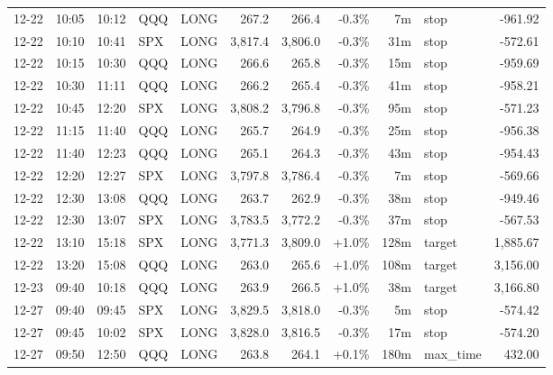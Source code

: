 \documentclass[11pt,a4paper,twoside]{article}
\begin{document}
\begin{center}
\begin{longtable}{>{\color{txtmain}}l l l l l r r r r >{\color{txtmain}}l r}
12-22 & 10:05 & 10:12 & QQQ & LONG & 267.2 & 266.4 & \textcolor{lossred}{-0.3\%} & 7m & stop & \textcolor{lossred}{-961.92} \\
12-22 & 10:10 & 10:41 & SPX & LONG & 3,817.4 & 3,806.0 & \textcolor{lossred}{-0.3\%} & 31m & stop & \textcolor{lossred}{-572.61} \\
12-22 & 10:15 & 10:30 & QQQ & LONG & 266.6 & 265.8 & \textcolor{lossred}{-0.3\%} & 15m & stop & \textcolor{lossred}{-959.69} \\
12-22 & 10:30 & 11:11 & QQQ & LONG & 266.2 & 265.4 & \textcolor{lossred}{-0.3\%} & 41m & stop & \textcolor{lossred}{-958.21} \\
12-22 & 10:45 & 12:20 & SPX & LONG & 3,808.2 & 3,796.8 & \textcolor{lossred}{-0.3\%} & 95m & stop & \textcolor{lossred}{-571.23} \\
12-22 & 11:15 & 11:40 & QQQ & LONG & 265.7 & 264.9 & \textcolor{lossred}{-0.3\%} & 25m & stop & \textcolor{lossred}{-956.38} \\
12-22 & 11:40 & 12:23 & QQQ & LONG & 265.1 & 264.3 & \textcolor{lossred}{-0.3\%} & 43m & stop & \textcolor{lossred}{-954.43} \\
12-22 & 12:20 & 12:27 & SPX & LONG & 3,797.8 & 3,786.4 & \textcolor{lossred}{-0.3\%} & 7m & stop & \textcolor{lossred}{-569.66} \\
12-22 & 12:30 & 13:08 & QQQ & LONG & 263.7 & 262.9 & \textcolor{lossred}{-0.3\%} & 38m & stop & \textcolor{lossred}{-949.46} \\
12-22 & 12:30 & 13:07 & SPX & LONG & 3,783.5 & 3,772.2 & \textcolor{lossred}{-0.3\%} & 37m & stop & \textcolor{lossred}{-567.53} \\
12-22 & 13:10 & 15:18 & SPX & LONG & 3,771.3 & 3,809.0 & \textcolor{wingreen}{+1.0\%} & 128m & target & \textcolor{wingreen}{1,885.67} \\
12-22 & 13:20 & 15:08 & QQQ & LONG & 263.0 & 265.6 & \textcolor{wingreen}{+1.0\%} & 108m & target & \textcolor{wingreen}{3,156.00} \\
12-23 & 09:40 & 10:18 & QQQ & LONG & 263.9 & 266.5 & \textcolor{wingreen}{+1.0\%} & 38m & target & \textcolor{wingreen}{3,166.80} \\
12-27 & 09:40 & 09:45 & SPX & LONG & 3,829.5 & 3,818.0 & \textcolor{lossred}{-0.3\%} & 5m & stop & \textcolor{lossred}{-574.42} \\
12-27 & 09:45 & 10:02 & SPX & LONG & 3,828.0 & 3,816.5 & \textcolor{lossred}{-0.3\%} & 17m & stop & \textcolor{lossred}{-574.20} \\
12-27 & 09:50 & 12:50 & QQQ & LONG & 263.8 & 264.1 & \textcolor{wingreen}{+0.1\%} & 180m & max\_time & \textcolor{wingreen}{432.00} \\

\end{longtable}
\end{center}
\end{document}
